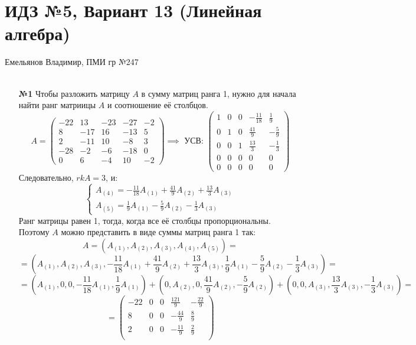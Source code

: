 \documentclass[a4paper]{article}
\newcommand{\case}[1]{\begin{cases} #1 \end{cases}}
\begin{document}
\section*{ИДЗ №5, Вариант 13 (Линейная алгебра)}
 {\large Емельянов Владимир, ПМИ гр №247}\\\\
\begin{enumerate}
    \item[\textbf{№1}]Чтобы разложить матрицу $A$ в сумму матриц ранга 1, нужно для начала найти ранг матриицы $A$ и соотношение её столбцов.
    $$
    A = \begin{pmatrix}
    -22 & 13 & -23 & -27 & -2 \\
    8 & -17 & 16 & -13 & 5 \\
    2 & -11 & 10 & -8 & 3 \\
    -28 & -2 & -6 & -18 & 0 \\
    0 & 6 & -4 & 10 & -2
    \end{pmatrix}
    \implies \text{ УСВ: } \begin{pmatrix}
        1 & 0 & 0 & -\frac{11}{18} & \frac{1}{9} \\
        0 & 1 & 0 & \frac{41}{9} & -\frac{5}{9} \\
        0 & 0 & 1 & \frac{13}{3} & -\frac{1}{3} \\
        0 & 0 & 0 & 0 & 0 \\
        0 & 0 & 0 & 0 & 0
        \end{pmatrix}$$
    Следовательно, $rkA = 3$, и:
    $$\case{
        A_{(4)} = -\frac{11}{18}A_{(1)}+\frac{41}{9}A_{(2)}+\frac{13}{3}A_{(3)}\\
        A_{(5)} = \frac{1}{9}A_{(1)}-\frac{5}{9}A_{(2)}-\frac{1}{3}A_{(3)}   
    }$$
    Ранг матрицы равен 1, тогда, когда все её столбцы пропорциональны. Поэтому $A$ можно представить в виде суммы матриц ранга 1 так:
    $$A = (A_{(1)}, A_{(2)}, A_{(3)}, A_{(4)}, A_{(5)}) =$$
    $$= (A_{(1)}, A_{(2)}, A_{(3)}, -\frac{11}{18}A_{(1)}+\frac{41}{9}A_{(2)}+\frac{13}{3}A_{(3)}, \frac{1}{9}A_{(1)}-\frac{5}{9}A_{(2)}-\frac{1}{3}A_{(3)})=$$
    $$=(A_{(1)}, 0, 0, -\frac{11}{18}A_{(1)}, \frac{1}{9}A_{(1)})+(0, A_{(2)}, 0, \frac{41}{9}A_{(2)}, -\frac{5}{9}A_{(2)})+(0, 0, A_{(3)}, \frac{13}{3}A_{(3)}, -\frac{1}{3}A_{(3)})=$$
    $$=\begin{pmatrix}
        -22 & 0 & 0 & \frac{121}{9} & -\frac{22}{9} \\
        8 & 0 & 0 & -\frac{44}{9} & \frac{8}{9} \\
        2 & 0 & 0 & -\frac{11}{9} & \frac{2}{9} \\

\end{pmatrix}$$
\end{enumerate}
\end{document}
